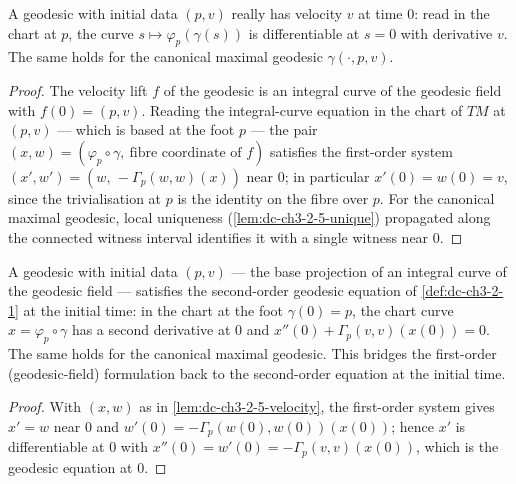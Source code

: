 \begin{lemma}
  \label{lem:dc-ch3-2-5-velocity}
  \leanok
  A geodesic with initial data $(p,v)$ really has velocity $v$ at time $0$: read
  in the chart at $p$, the curve $s\mapsto\varphi_p(\gamma(s))$ is differentiable
  at $s=0$ with derivative $v$. The same holds for the canonical maximal
  geodesic $\gamma(\cdot,p,v)$.
\end{lemma}
\begin{proof}
  \sketch
  \leanok
  The velocity lift $f$ of the geodesic is an integral curve of the geodesic
  field with $f(0)=(p,v)$. Reading the integral-curve equation in the chart of
  $TM$ at $(p,v)$ — which is based at the foot $p$ — the pair
  $(x,w)=(\varphi_p\circ\gamma,\ \text{fibre coordinate of }f)$ satisfies the
  first-order system $(x',w')=(w,\,-\Gamma_p(w,w)(x))$ near $0$; in particular
  $x'(0)=w(0)=v$, since the trivialisation at $p$ is the identity on the fibre
  over $p$. For the canonical maximal geodesic, local uniqueness
  (\cref{lem:dc-ch3-2-5-unique}) propagated along the connected witness interval
  identifies it with a single witness near $0$.
\end{proof}

\begin{lemma}
  \label{lem:dc-ch3-2-5-equation}
  \leanok
  A geodesic with initial data $(p,v)$ — the base projection of an integral
  curve of the geodesic field — satisfies the second-order geodesic equation of
  \cref{def:dc-ch3-2-1} at the initial time: in the chart at the foot
  $\gamma(0)=p$, the chart curve $x=\varphi_p\circ\gamma$ has a second
  derivative at $0$ and $x''(0)+\Gamma_p(v,v)(x(0))=0$. The same holds for the
  canonical maximal geodesic. This bridges the first-order (geodesic-field)
  formulation back to the second-order equation at the initial time.
\end{lemma}
\begin{proof}
  \sketch
  \leanok
  With $(x,w)$ as in \cref{lem:dc-ch3-2-5-velocity}, the first-order system
  gives $x'=w$ near $0$ and $w'(0)=-\Gamma_p(w(0),w(0))(x(0))$; hence $x'$ is
  differentiable at $0$ with
  $x''(0)=w'(0)=-\Gamma_p(v,v)(x(0))$, which is the geodesic equation at $0$.

\end{proof}


